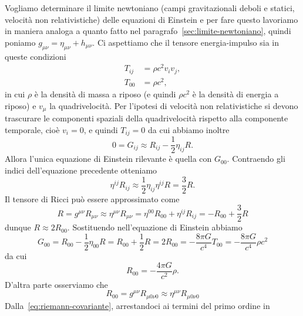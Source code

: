 Vogliamo determinare il limite newtoniano (campi gravitazionali deboli e
statici, velocità non relativistiche) delle equazioni di Einstein e per fare
questo lavoriamo in maniera analoga a quanto fatto nel
paragrafo~\ref{sec:limite-newtoniano}, quindi poniamo
$g_{\mu\nu} = \eta_{\mu\nu} + h_{\mu\nu}$.  Ci aspettiamo che il tensore
energia-impulso sia in queste condizioni
\begin{subequations}
  \begin{align}
    T_{ij} &= \rho c^{2} v_{i} v_{j}, \\
    T_{00} &= \rho c^{2},
  \end{align}
\end{subequations}
in cui $\rho$ è la densità di massa a riposo (e quindi $\rho c^{2}$ è la densità
di energia a riposo) e $v_{\mu}$ la quadrivelocità.  Per l'ipotesi di velocità
non relativistiche si devono trascurare le componenti spaziali della
quadrivelocità rispetto alla componente temporale, cioè $v_{i} = 0$, e quindi
$T_{ij} = 0$ da cui abbiamo inoltre
\begin{equation}
  0 = G_{ij} \approx R_{ij} - \frac{1}{2}\eta_{ij}R.
\end{equation}
Allora l'unica equazione di Einstein rilevante è quella con $G_{00}$.
Contraendo gli indici dell'equazione precedente otteniamo
\begin{equation}
  \eta^{ij}R_{ij} \approx \frac{1}{2} \eta_{ij}\eta^{ij} R = \frac{3}{2} R.
\end{equation}
Il tensore di Ricci può essere approssimato come
\begin{equation}
  R = g^{\mu\nu}R_{\mu\nu} \approx \eta^{\mu\nu} R_{\mu\nu} = \eta^{00}R_{00} +
  \eta^{ij}R_{ij} = -R_{00} + \frac{3}{2} R
\end{equation}
dunque $R \approx 2 R_{00}$.  Sostituendo nell'equazione di Einstein abbiamo
\begin{equation}
  G_{00} = R_{00} - \frac{1}{2} \eta_{00}R = R_{00} + \frac{1}{2} R = 2 R_{00} =
  -\frac{8\pi G}{c^{4}} T_{00} = -\frac{8\pi G}{c^{4}} \rho c^{2}
\end{equation}
da cui
\begin{equation}
  R_{00} = -\frac{4\pi G}{c^{2}} \rho.
\end{equation}
D'altra parte osserviamo che
\begin{equation}
  R_{00} = g^{\mu\nu}R_{\mu 0\nu 0} \approx \eta^{\mu\nu}R_{\mu 0\nu 0}
\end{equation}
Dalla~\eqref{eq:riemann-covariante}, arrestandoci ai termini del primo ordine in
